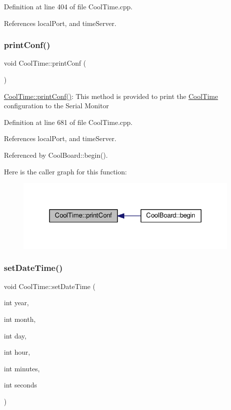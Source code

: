 Definition at line 404 of file Cool\+Time.\+cpp.



References local\+Port, and time\+Server.

\mbox{\label{class_cool_time_af355e7f9b3898211cd2ff25eab5933b1}} 
\subsubsection{\texorpdfstring{print\+Conf()}{printConf()}}
{\footnotesize\ttfamily void Cool\+Time\+::print\+Conf (\begin{DoxyParamCaption}{ }\end{DoxyParamCaption})}

\hyperlink{class_cool_time_af355e7f9b3898211cd2ff25eab5933b1}{Cool\+Time\+::print\+Conf()}\+: This method is provided to print the \hyperlink{class_cool_time}{Cool\+Time} configuration to the Serial Monitor 

Definition at line 681 of file Cool\+Time.\+cpp.



References local\+Port, and time\+Server.



Referenced by Cool\+Board\+::begin().

Here is the caller graph for this function\+:
\nopagebreak
\begin{figure}[H]
\begin{center}
\leavevmode
\includegraphics[width=312pt]{d6/d49/class_cool_time_af355e7f9b3898211cd2ff25eab5933b1_icgraph}
\end{center}
\end{figure}
\mbox{\label{class_cool_time_ab81ea7fdaace111aa01cc1ec84c6d297}} 
\subsubsection{\texorpdfstring{set\+Date\+Time()}{setDateTime()}}
{\footnotesize\ttfamily void Cool\+Time\+::set\+Date\+Time (\begin{DoxyParamCaption}\item[{int}]{year,  }\item[{int}]{month,  }\item[{int}]{day,  }\item[{int}]{hour,  }\item[{int}]{minutes,  }\item[{int}]{seconds }\end{DoxyParamCaption})}

